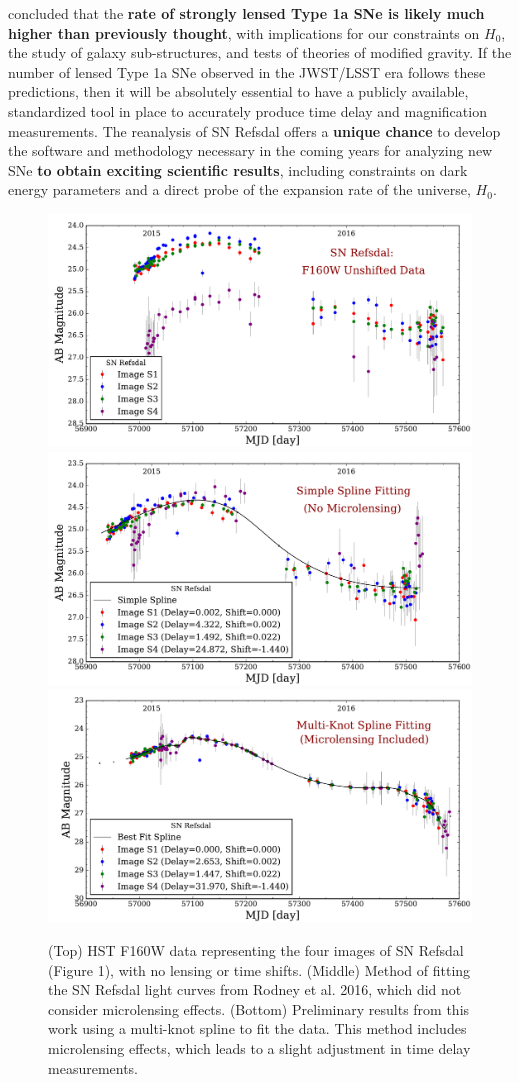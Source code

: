 \cite{Goobar:2016} concluded that the \textbf{rate of strongly lensed Type 1a SNe is likely much higher than
previously thought}, with implications for our constraints on $H_0$, the study of galaxy sub-structures,
and tests of theories of modified gravity. If the number of lensed Type 1a SNe observed in the JWST/LSST
era follows these predictions, then it will be absolutely essential to have a publicly available, standardized 
tool in place to accurately produce time delay and magnification measurements. The reanalysis of SN 
Refsdal offers a \textbf{unique chance} to develop the software and methodology necessary in the coming years for
analyzing new SNe \textbf{to obtain exciting scientific results}, including constraints on dark energy parameters and a
direct probe of the expansion rate of the universe, $H_0$.

\begin{figure}
\centering
\includegraphics[width=.7\textwidth]{FIG/points_plot_2017.pdf}
\includegraphics[width=.7\textwidth]{FIG/refs_plot_2017.pdf}
\includegraphics[width=.7\textwidth]{FIG/spline_plot_2017.pdf}
\caption{(Top) HST F160W data representing the four images of SN
Refsdal (Figure 1), with no lensing or time shifts. (Middle) Method of
fitting the SN Refsdal light curves from Rodney et al. 2016, which did
not consider microlensing effects. (Bottom) Preliminary results from 
this work using a multi-knot spline to fit the data. This method 
includes microlensing effects, which leads to a slight adjustment in 
time delay measurements. }
\end{figure}

\bigskip
 
 




